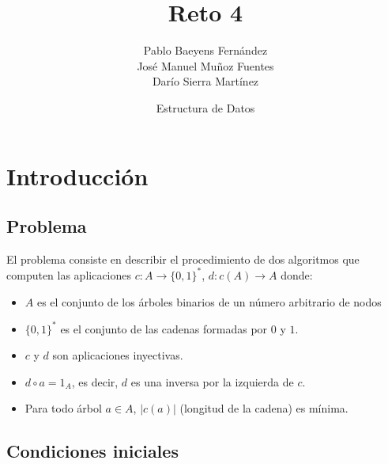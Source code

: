 \documentclass{article}
\title{Reto 4}
\date{Estructura de Datos}
\author{Pablo Baeyens Fernández\\José Manuel Muñoz Fuentes\\Darío Sierra Martínez}
\begin{document}
\maketitle

\section{Introducción}

\subsection{Problema}


El problema consiste en describir el procedimiento de dos algoritmos que computen
las aplicaciones $c: A \to \{0,1\}^{\ast}$, $d: c(A) \to A$ donde:

\begin{itemize}
  \item $A$ es el conjunto de los árboles binarios de un número arbitrario de nodos
  \item $\{0,1\}^{\ast}$ es el conjunto de las cadenas formadas por $0$ y $1$.
  \item $c$ y $d$ son aplicaciones inyectivas.
  \item $d \circ a = 1_A$, es decir, $d$ es una inversa por la izquierda de $c$.
  \item Para todo árbol $a \in A$, $|c(a)|$ (longitud de la cadena) es mínima.
\end{itemize}

\subsection{Condiciones iniciales}

\end{document}
